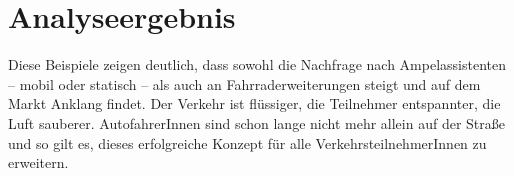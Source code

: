 \section{Analyseergebnis}
Diese Beispiele zeigen deutlich, dass sowohl die Nachfrage nach Ampelassistenten -- mobil oder statisch -- als auch an Fahrraderweiterungen steigt und auf dem Markt Anklang findet. Der Verkehr ist flüssiger, die Teilnehmer entspannter, die Luft sauberer. AutofahrerInnen sind schon lange nicht mehr allein auf der Straße und so gilt es, dieses erfolgreiche Konzept für alle VerkehrsteilnehmerInnen zu erweitern.
